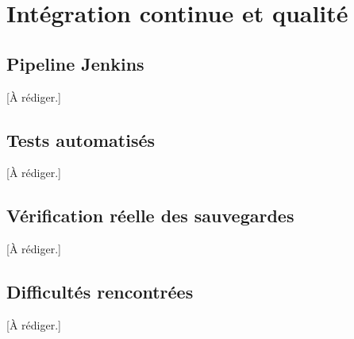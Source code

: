 \chapter{Intégration continue et qualité}
\label{chap:cicd}

\section{Pipeline Jenkins}
[À rédiger.]

\section{Tests automatisés}
[À rédiger.]

\section{Vérification réelle des sauvegardes}
[À rédiger.]

\section{Difficultés rencontrées}
[À rédiger.]

\clearpage
